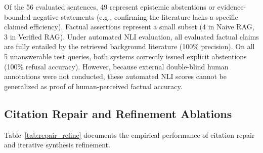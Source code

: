 \documentclass[conference]{IEEEtran}
\begin{document}
Of the 56 evaluated sentences, 49 represent epistemic abstentions or evidence-bounded negative statements (e.g., confirming the literature lacks a specific claimed efficiency). Factual assertions represent a small subset (4 in Naive RAG, 3 in Verified RAG). Under automated NLI evaluation, all evaluated factual claims are fully entailed by the retrieved background literature (100\% precision). On all 5 unanswerable test queries, both systems correctly issued explicit abstentions (100\% refusal accuracy). However, because external double-blind human annotations were not conducted, these automated NLI scores cannot be generalized as proof of human-perceived factual accuracy.

\subsection{Citation Repair and Refinement Ablations}
Table~\ref{tab:repair_refine} documents the empirical performance of citation repair and iterative synthesis refinement.

\begin{table}[htbp]
\caption{Citation Repair and Refinement Evaluation}
\label{tab:repair_refine}
\centering
{}
\end{table}
\end{document}
